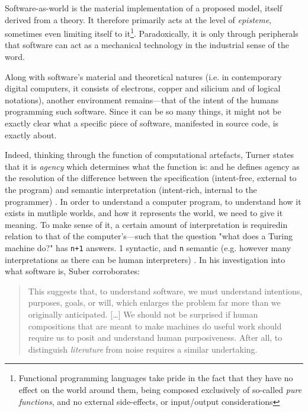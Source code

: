Software-as-world is the material implementation of a proposed model, itself derived from a theory. It therefore primarily acts at the level of \emph{episteme}, sometimes even limiting itself to it\footnote{Functional programming languages take pride in the fact that they have no effect on the world around them, being composed exclusively of so-called \emph{pure functions}, and no external side-effects, or input/output considerations}. Paradoxically, it is only through peripherals that software can act as a mechanical technology in the industrial sense of the word.

Along with software's material and theoretical natures (i.e. in contemporary digital computers, it consists of electrons, copper and silicium and of logical notations), another environment remains—that of the intent of the humans programming such software. Since it can be so many things, it might not be exactly clear what a specific piece of software, manifested in source code, is exactly about.

Indeed, thinking through the function of computational artefacts, Turner states that it is \emph{agency} which determines what the function is: and he defines agency as the resolution of the difference between the specification (intent-free, external to the program) and semantic interpretation (intent-rich, internal to the programmer) \citep{turner_computational_2018}. In order to understand a computer program, to understand how it exists in mutliple worlds, and how it represents the world, we need to give it meaning. To make sense of it, a certain amount of interpretation is requiredin relation to that of the computer's—such that the question "what does a Turing machine do?" has \lstinline{n+1} answers. 1 syntactic, and \lstinline{n} semantic (e.g. however many interpretations as there can be human interpreters) \citep{rapaport_philosophy_2005}. In his investigation into what software is, Suber corroborates:

\begin{quote}
    This suggests that, to understand software, we must understand intentions, purposes, goals, or will, which enlarges the problem far more than we originally anticipated. [\dots] We should not be surprised if human compositions that are meant to make machines do useful work should require us to posit and understand human purposiveness. After all, to distinguish \emph{literature} from noise requires a similar undertaking. \citep{suber_what_1988}
\end{quote}

